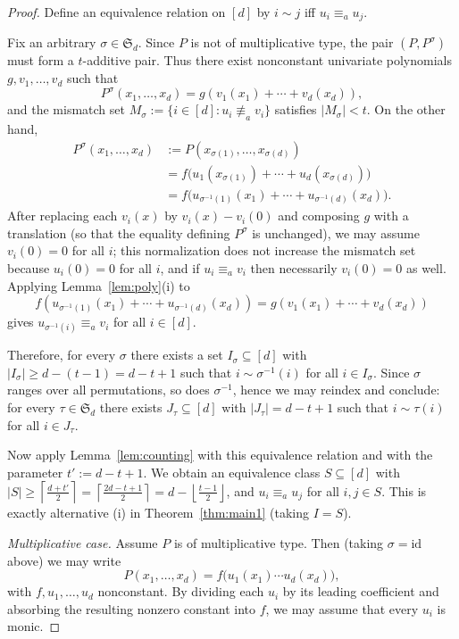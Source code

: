 \documentclass[12pt,reqno]{amsart}
\numberwithin{equation}{section}
\begin{document}
\begin{proof}
Define an equivalence relation on $[d]$ by $i\sim j$ iff $u_i\equiv_a u_j$.

Fix an arbitrary $\sigma\in\mathfrak S_d$.
Since $P$ is not of multiplicative type, the pair $(P,P^{\sigma})$ must form a $t$-additive pair.
Thus there exist nonconstant univariate polynomials $g,v_1,\ldots,v_d$ such that
$$P^{\sigma}(x_1,\ldots,x_d)=g(v_1(x_1)+\cdots+v_d(x_d)),$$
and the mismatch set
$M_{\sigma}:=\{i\in[d]: u_i\not\equiv_a v_i\}$
satisfies $|M_{\sigma}|<t$.
On the other hand,
\begin{align*}
P^{\sigma}(x_1,\ldots,x_d)
&:=P(x_{\sigma(1)},\ldots,x_{\sigma(d)})\\
&=f\big(u_1(x_{\sigma(1)})+\cdots+u_d(x_{\sigma(d)})\big)\\
&=f\big(u_{\sigma^{-1}(1)}(x_1)+\cdots+u_{\sigma^{-1}(d)}(x_d)\big).
\end{align*}
After replacing each $v_i(x)$ by $v_i(x)-v_i(0)$ and composing $g$ with a translation (so that the equality defining $P^\sigma$ is unchanged),
we may assume $v_i(0)=0$ for all $i$; this normalization does not increase the mismatch set because $u_i(0)=0$ for all $i$, and if $u_i\equiv_a v_i$ then necessarily $v_i(0)=0$ as well.
Applying Lemma~\ref{lem:poly}(i) to
$$f(u_{\sigma^{-1}(1)}(x_1)+\cdots+u_{\sigma^{-1}(d)}(x_d))
=g(v_1(x_1)+\cdots+v_d(x_d))$$
gives $u_{\sigma^{-1}(i)}\equiv_a v_i$ for all $i\in[d]$.

Therefore, for every $\sigma$ there exists a set $I_{\sigma}\subseteq[d]$ with
$|I_{\sigma}|\ge d-(t-1)=d-t+1$
such that $i\sim \sigma^{-1}(i)$ for all $i\in I_{\sigma}$.
Since $\sigma$ ranges over all permutations, so does $\sigma^{-1}$, hence we may reindex and conclude:
for every $\tau\in\mathfrak S_d$ there exists $J_{\tau}\subseteq[d]$ with $|J_{\tau}|=d-t+1$ such that
$i\sim \tau(i)$ for all $i\in J_{\tau}$.

Now apply Lemma~\ref{lem:counting} with this equivalence relation and with the parameter
$t':=d-t+1$.
We obtain an equivalence class $S\subseteq[d]$ with
$|S|\ge \left\lceil \frac{d+t'}2\right\rceil
=\left\lceil \frac{2d-t+1}{2}\right\rceil
=d-\left\lfloor \frac{t-1}{2}\right\rfloor$,
and $u_i\equiv_a u_j$ for all $i,j\in S$.
This is exactly alternative (i) in Theorem~\ref{thm:main1} (taking $I=S$).

\smallskip
\noindent\emph{Multiplicative case.}
Assume $P$ is of multiplicative type. Then (taking $\sigma=\mathrm{id}$ above) we may write
\[
P(x_1,\ldots,x_d)=f\big(u_1(x_1)\cdots u_d(x_d)\big),
\]
with $f,u_1,\ldots,u_d$ nonconstant.
By dividing each $u_i$ by its leading coefficient and absorbing the resulting nonzero constant into $f$,
we may assume that every $u_i$ is monic.


\end{proof}
\end{document}
